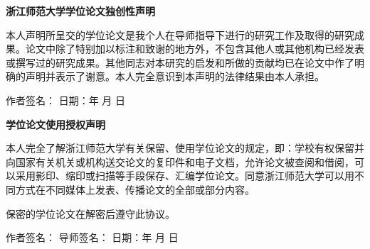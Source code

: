 \clearpage

{}
\begin{center}
    \bfseries 浙江师范大学学位论文独创性声明
\end{center}

\vspace{40pt}

{\linespread{1.8}\selectfont
    本人声明所呈交的学位论文是我个人在导师指导下进行的研究工作及取得的研究成果。论文中除了特别加以标注和致谢的地方外，不包含其他人或其他机构已经发表或撰写过的研究成果。其他同志对本研究的启发和所做的贡献均已在论文中作了明确的声明并表示了谢意。本人完全意识到本声明的法律结果由本人承担。\par
}

\vspace{40pt}

\begin{flushright}
    作者签名：\hspace{6em} 日期：\qquad 年 \quad 月 \quad 日
\end{flushright}

\vspace{80pt}

{}
\begin{center}
    \bfseries 学位论文使用授权声明
\end{center}

\vspace{40pt}

{\linespread{1.8}\selectfont
    本人完全了解浙江师范大学有关保留、使用学位论文的规定，即：学校有权保留并向国家有关机关或机构送交论文的复印件和电子文档，允许论文被查阅和借阅，可以采用影印、缩印或扫描等手段保存、汇编学位论文。同意浙江师范大学可以用不同方式在不同媒体上发表、传播论文的全部或部分内容。

    保密的学位论文在解密后遵守此协议。\par
}

\vspace{40pt}

\begin{flushright}
    作者签名：\hspace{6em} 导师签名：\hspace{6em} 日期：\qquad 年 \quad 月 \quad 日
\end{flushright}
